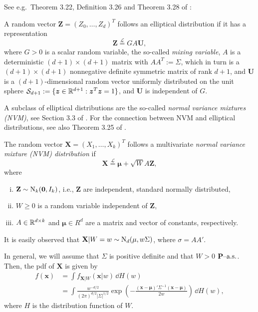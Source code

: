 \providecommand{\bZ}{\ensuremath{\bm{Z}}}
\providecommand{\bU}{\ensuremath{\bm{U}}}
\providecommand{\bu}{\ensuremath{\bm{u}}}

See e.g.\ Theorem 3.22, Definition 3.26 and Theorem 3.28 of
\citep{McNeil2005}:
\begin{definition}
  A random vector $\bZ=(Z_0,\ldots, Z_d)^T$ follows an elliptical
  distribution if it has a representation
  \begin{equation*}
    \bZ\stackrel{\mathcal L}= G A \bU,
  \end{equation*}
  where $G>0$ is a scalar random variable, the so-called {\em mixing
  variable}, $A$ is a deterministic $(d+1)\times (d+1)$ matrix with
$A A^T:=\Sigma$, which in turn is a $(d+1)\times (d+1)$ nonnegative
definite symmetric matrix of rank $d+1$, and $\bU$ is a
$(d+1)$-dimensional random vector uniformly distributed on the unit
sphere $\mathcal S_{d+1}:=\{\bm{z}\in {\mathbb{R}}^{d+1}: \bm z^T \bm z=1\}$,
and $\bU$ is independent of $G$.
\end{definition}

A subclass of elliptical distributions are the so-called {\em normal
  variance mixtures (NVM)}, see Section 3.3 of \citep{McNeil2005}. For the
connection between NVM and elliptical distributions, see also Theorem
3.25 of \citep{McNeil2005}. 

\begin{definition}
  The random vector $\mathbf X=(X_1, \ldots, X_k)^T$ follows a
  multivariate {\em normal variance mixture (NVM) distribution} if
  \begin{equation*}
    \mathbf X \stackrel{\mathcal L}{=} \mathbf \mu + \sqrt{W} A\mathbf
    Z, 
  \end{equation*}
  where
  \begin{enumerate}[(i)]
  \item $\mathbf Z\sim {\rm N}_k(\mathbf 0, I_k)$, i.e., $\mathbf Z$ are
    independent, standard normally distributed,
  \item $W\geq 0$ is a random variable independent of $\mathbf Z$,
  \item $A\in {\mathbb{R}}^{d\times k}$ and $\mathbf \mu\in R^d$ are a matrix
    and vector of constants, respectively. 
  \end{enumerate}
\end{definition}

It is easily observed that $\mathbf X|W=w \sim {\rm N}_d(\mathbf \mu,
w\Sigma)$, where $\sigma = A A'$.

In general, we will assume that $\Sigma$ is positive definite and that
$W>0$ $\text{{\bf P}--a.s.}$. Then, the pdf of $\mathbf X$ is given by
\begin{align*}
  f(\mathbf x) &= \int f_{\mathbf X|W} (\mathbf x|w)\, \dd H(w)\\
  &= \int \frac{w^{-d/2}} {(2\pi)^{d/2} |\Sigma|^{1/2}} \exp\left( -
    \frac{(\mathbf x-\mathbf \mu)' \Sigma^{-1} (\mathbf x-\mathbf
    \mu)} {2w} \right)\, \dd H(w),
\end{align*}
where $H$ is the distribution function of $W$.

